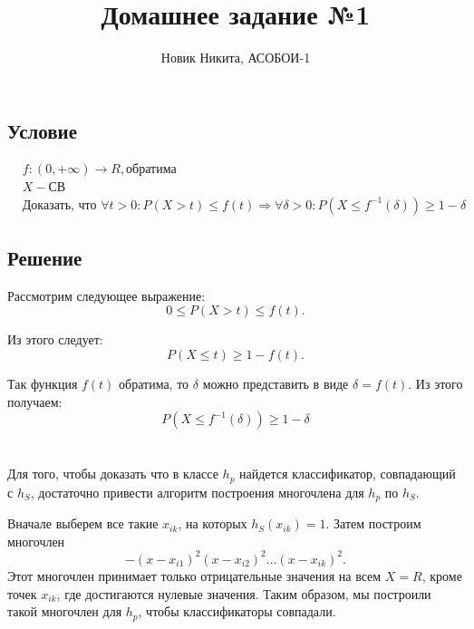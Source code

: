 \documentclass[a4paper]{article}
\author{Новик Никита, АСОБОИ-1}
\title{Домашнее задание №1}
\renewcommand\leq\leqslant
\renewcommand\geq\geqslant
\begin{document}
\maketitle
\section{}
\subsection{Условие}
$$
\begin{aligned}
    &f: (0,+\infty) \rightarrow R,  \text{обратима} \\
    &X - \text{СВ} \\
    &\text{Доказать, что } \forall t > 0 : P(X>t) \leq f(t) \Rightarrow \forall \delta > 0 : P(X \leq f^{-1}(\delta)) \geq 1 - \delta
\end{aligned}
$$
\subsection{Решение}
Рассмотрим следующее выражение:
\begin{equation}
    0 \leq P(X > t) \leq f(t).
\end{equation}

Из этого следует:
\begin{equation}
    P(X \leq t) \geq 1 - f(t).
\end{equation}

Так функция $f(t)$ обратима, то $\delta$ можно представить в виде $\delta = f(t)$. Из этого получаем:
\begin{equation}
    P(X \leq f^{-1}(\delta)) \geq 1 - \delta
\end{equation}

\section{}

Для того, чтобы доказать что в классе $h_p$ найдется классификатор, совпадающий с $h_S$, достаточно привести алгоритм построения многочлена для $h_p$ по $h_S$.

Вначале выберем все такие $x_{ik}$, на которых $h_S(x_{ik}) = 1$. Затем построим многочлен 
$$-(x-x_{i1})^2(x-x_{i2})^2\dots(x-x_{ik})^2.$$
Этот многочлен принимает только отрицательные значения на всем $X=R$, кроме точек $x_{ik}$, где достигаются нулевые значения. Таким образом, мы построили такой многочлен для $h_p$, чтобы классификаторы совпадали.
\end{document}
